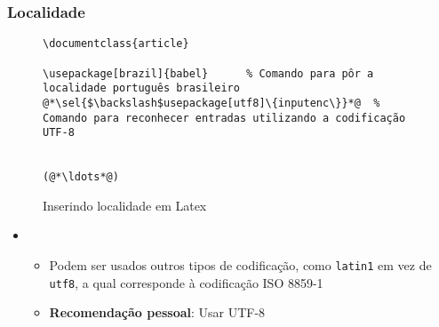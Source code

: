 \begin{frame}[fragile] \frametitle{Localidade}
\begin{figure}[!t]
\caption{Inserindo localidade em Latex}
\begin{lstlisting}
\documentclass{article}

\usepackage[brazil]{babel}		% Comando para pôr a localidade português brasileiro
@*\sel{$\backslash$usepackage[utf8]\{inputenc\}}*@	% Comando para reconhecer entradas utilizando a codificação UTF-8


(@*\ldots*@)
\end{lstlisting}
\ownsrc
\end{figure}

\begin{itemize}
	\item {}
	\begin{itemize}
		\item Podem ser usados outros tipos de codificação, como \texttt{latin1} em vez de \texttt{utf8}, a qual corresponde à codificação ISO 8859-1
		\item \textbf{Recomendação pessoal}: Usar UTF-8
	\end{itemize}
\end{itemize}
\end{frame}







